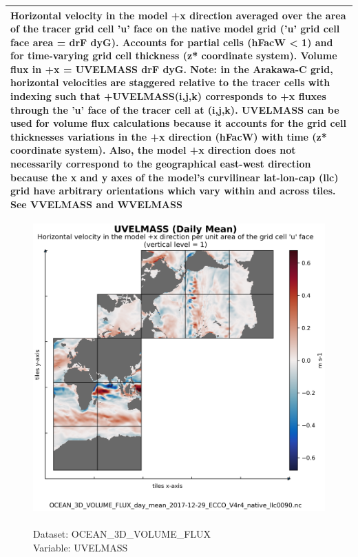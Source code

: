 \begin{longtable}{|p{}|p{}|p{}|p{}|}
\multicolumn{4}{|p{1\textwidth}|}{Horizontal velocity in the model +x direction averaged over the area of the tracer grid cell 'u' face on the native model grid ('u' grid cell face area = drF dyG). Accounts for partial cells (hFacW < 1) and for time-varying grid cell thickness (z* coordinate system). Volume flux in +x = UVELMASS drF dyG. Note: in the Arakawa-C grid, horizontal velocities are staggered relative to the tracer cells with indexing such that +UVELMASS(i,j,k) corresponds to +x fluxes through the 'u' face of the tracer cell at (i,j,k). UVELMASS can be used for volume flux calculations because it accounts for the grid cell thicknesses variations in the +x direction (hFacW) with time (z* coordinate system). Also, the model +x direction does not necessarily correspond to the geographical east-west direction because the x and y axes of the model's curvilinear lat-lon-cap (llc) grid have arbitrary orientations which vary within and across tiles. See VVELMASS and WVELMASS} \\ \hline
\end{longtable}

\begin{figure}[H]
\centering
\includegraphics[scale=0.5]{../images/plots/native_plots/Ocean_Three-Dimensional_Volume_Fluxes/UVELMASS.png}
\caption{\\Dataset: OCEAN\_3D\_VOLUME\_FLUX\\Variable: UVELMASS}
\label{tab:table-OCEAN_3D_VOLUME_FLUX_UVELMASS-Plot}
\end{figure}
\pagebreak
